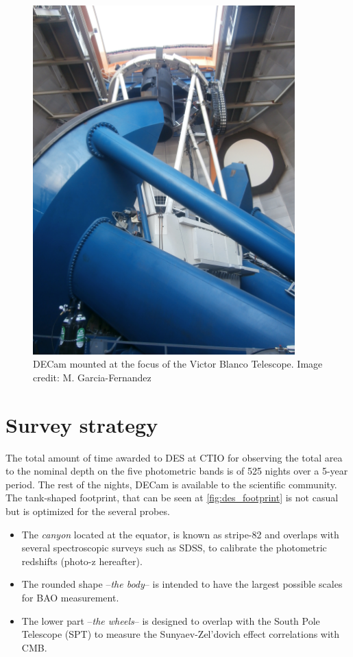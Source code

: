 \begin{figure}
\begin{center}
\includegraphics[width=0.9\textwidth]{./Pictures/telescope_DES_mine.jpg}
\caption{DECam mounted at the focus of the Victor Blanco Telescope. Image credit: M. Garcia-Fernandez}
\label{fig:decam}
\end{center}
\end{figure}

\section{Survey strategy}
The total amount of time awarded to DES at CTIO for observing the total area to the nominal depth on the five photometric bands is of 525 nights over a 5-year period. The rest of the nights, DECam is available to the scientific community. The tank-shaped footprint, that can be seen at \autoref{fig:des_footprint} is not casual but is optimized for the several probes.
\begin{itemize}
	\item The {\it canyon} located at the equator, is known as stripe-82 and overlaps with several spectroscopic surveys such as SDSS, to calibrate the photometric redshifts (photo-z hereafter).
    \item The rounded shape --{\it the body}-- is intended to have the largest possible scales for BAO measurement.
    \item The lower part --{\it the wheels}-- is designed to overlap with the South Pole Telescope (SPT) to measure the Sunyaev-Zel'dovich effect correlations with CMB.
\end{itemize}

